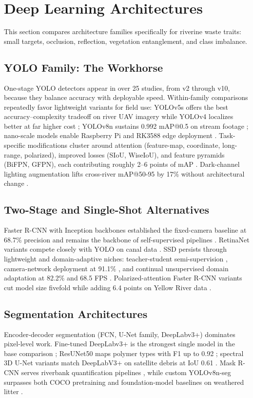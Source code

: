 \documentclass[12pt]{article}
\begin{document}
\section{Deep Learning Architectures}
\label{sec:architectures}

This section compares architecture families specifically for riverine waste traits: small targets, occlusion, reflection, vegetation entanglement, and class imbalance.

\subsection{YOLO Family: The Workhorse}
One-stage YOLO detectors appear in over 25 studies, from v2 through v10, because they balance accuracy with deployable speed. Within-family comparisons repeatedly favor lightweight variants for field use: YOLOv5s offers the best accuracy--complexity tradeoff on river UAV imagery while YOLOv4 localizes better at far higher cost \cite{Maharjan2022}; YOLOv8n sustains 0.992 mAP@0.5 on stream footage \cite{Lee2025}; nano-scale models enable Raspberry Pi and RK3588 edge deployment \cite{Sio2022,Yan2025}. Task-specific modifications cluster around attention (feature-map, coordinate, long-range, polarized), improved losses (SIoU, WiseIoU), and feature pyramids (BiFPN, GFPN), each contributing roughly 2--6 points of mAP \cite{Lin2021,Yang2022,Peng2024,Chen2023}. Dark-channel lighting augmentation lifts cross-river mAP@50-95 by 17\% without architectural change \cite{Saddi2024}.

\subsection{Two-Stage and Single-Shot Alternatives}
Faster R-CNN with Inception backbones established the fixed-camera baseline at 68.7\% precision \cite{Lieshout2020} and remains the backbone of self-supervised pipelines \cite{JiaSwAV2024}. RetinaNet variants compete closely with YOLO on canal data \cite{Tharani2021}. SSD persists through lightweight and domain-adaptive niches: teacher-student semi-supervision \cite{Sun2025}, camera-network deployment at 91.1\% \cite{Renfei2023}, and continual unsupervised domain adaptation at 82.2\% and 68.5 FPS \cite{EAAI2023}. Polarized-attention Faster R-CNN variants cut model size fivefold while adding 6.4 points on Yellow River data \cite{MPFasterRCNN2024}.

\subsection{Segmentation Architectures}
Encoder-decoder segmentation (FCN, U-Net family, DeepLabv3+) dominates pixel-level work. Fine-tuned DeepLabv3+ is the strongest single model in the base comparison \cite{Pati2025}; ResUNet50 maps polymer types with F1 up to 0.92 \cite{Jakovljevic2020}; spectral 3D U-Net variants match DeepLabV3+ on satellite debris at IoU 0.61 \cite{SoleGomez2022}. Mask R-CNN serves riverbank quantification pipelines \cite{Trinh2022}, while custom YOLOv8n-seg surpasses both COCO pretraining and foundation-model baselines on weathered litter \cite{Pan2024}.
\end{document}
